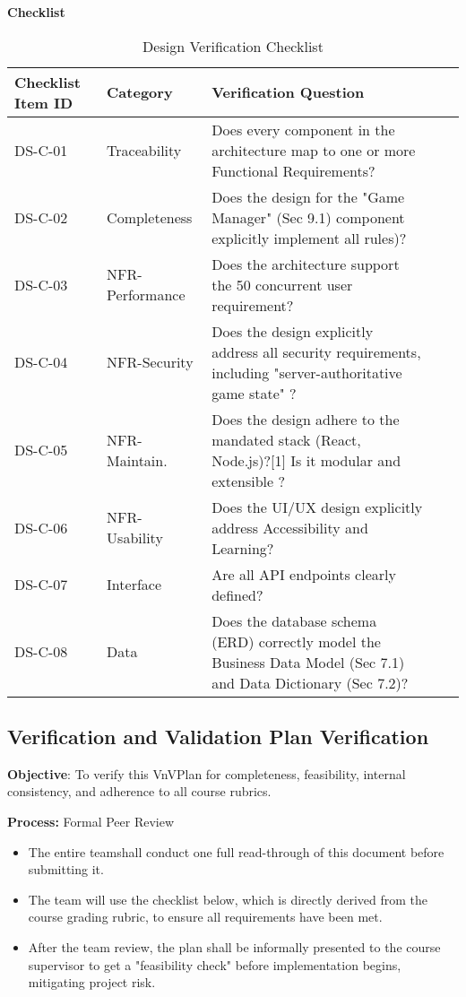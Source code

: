 \documentclass[12pt, titlepage]{article}
\begin{document}
\noindent \textbf{Checklist}
\begin{table}[H]
\centering
\caption{Design Verification Checklist}
\label{tab:design-checklist}
\begin{tabular}{|l|l|p{}|l|l|}
\hline
\textbf{Checklist Item ID} & \textbf{Category} & \textbf{Verification Question}  \\ \hline
DS-C-01 & Traceability & Does every component in the architecture map to one or more Functional Requirements? \\ \hline
DS-C-02 & Completeness & Does the design for the "Game Manager" (Sec 9.1) component explicitly implement all rules)? \\ \hline
DS-C-03 & NFR-Performance & Does the architecture support the 50 concurrent user requirement? \\ \hline
DS-C-04 & NFR-Security & Does the design explicitly address all security requirements, including "server-authoritative game state" ?  \\ \hline
DS-C-05 & NFR-Maintain. & Does the design adhere to the mandated stack (React, Node.js)?[1] Is it modular and extensible ?  \\ \hline
DS-C-06 & NFR-Usability & Does the UI/UX design explicitly address Accessibility and Learning?  \\ \hline
DS-C-07 & Interface & Are all API endpoints clearly defined?  \\ \hline
DS-C-08 & Data & Does the database schema (ERD) correctly model the Business Data Model (Sec 7.1) and Data Dictionary (Sec 7.2)? \\ \hline
\end{tabular}
\end{table}

\subsection{Verification and Validation Plan Verification}

\noindent \textbf{Objective}: To verify this VnVPlan for completeness, feasibility, internal consistency, and adherence to all course rubrics.

\noindent \textbf{Process:} Formal Peer Review
\begin{itemize}
	\item The entire teamshall conduct one full read-through of this document before submitting it.
	\item The team will use the checklist below, which is directly derived from the course grading rubric, to ensure all requirements have been met.
	\item After the team review, the plan shall be informally presented to the course supervisor to get a "feasibility check" before implementation begins, mitigating project risk.
\end{itemize}
\end{document}
